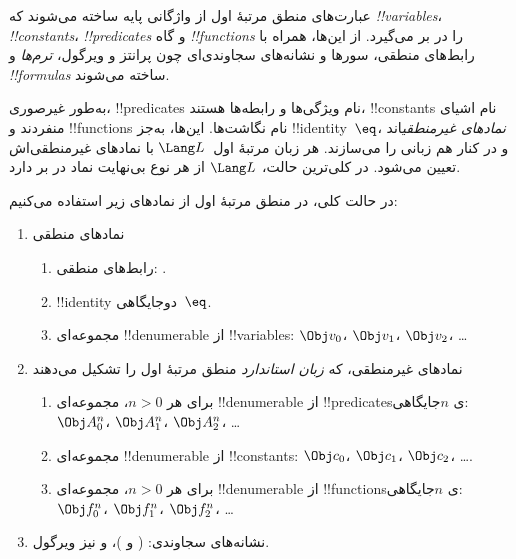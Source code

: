 \documentclass[../../../include/open-logic-section]{subfiles}
\begin{document}



عبارت‌های منطق مرتبهٔ اول از واژگانی پایه ساخته می‌شوند که
\emph{!!{variable}s}، \emph{!!{constant}s}،
\emph{!!{predicate}s} و گاه \emph{!!{function}s} را در بر می‌گیرد.
از این‌ها، همراه با رابط‌های منطقی، سورها و نشانه‌های سجاوندی‌ای چون
پرانتز و ویرگول، \emph{ترم‌ها} و \emph{!!{formula}s} ساخته می‌شوند.

\begin{explain}
به‌طور غیرصوری، !!{predicate}s نام ویژگی‌ها و رابطه‌ها هستند،
!!{constant}s نام اشیای منفردند و !!{function}s نام نگاشت‌ها. این‌ها، به‌جز
!!{identity}~$\eq$، \emph{نمادهای غیرمنطقی}اند و در کنار هم زبانی را
می‌سازند. هر زبان مرتبهٔ اول~$\Lang L$ با نمادهای غیرمنطقی‌اش تعیین می‌شود.
در کلی‌ترین حالت، $\Lang L$ از هر نوع بی‌نهایت نماد در بر دارد.
\end{explain}

در حالت کلی، در منطق مرتبهٔ اول از نمادهای زیر استفاده می‌کنیم:

\begin{enumerate}
\item نمادهای منطقی
\begin{enumerate}
\item رابط‌های منطقی:
  \startycommalist
  .
\item !!{identity} دوجایگاهی~$\eq$.
\item مجموعه‌ای !!{denumerable} از !!{variable}s: $\Obj v_0$، $\Obj v_1$، $\Obj
  v_2$، \dots
\end{enumerate}
\item نمادهای غیرمنطقی، که \emph{زبان استاندارد} منطق مرتبهٔ اول را
تشکیل می‌دهند
\begin{enumerate}
\item برای هر $n>0$، مجموعه‌ای !!{denumerable} از !!{predicate}sی
  $n$جایگاهی: $\Obj A^n_0$، $\Obj A^n_1$، $\Obj A^n_2$، \dots
\item مجموعه‌ای !!{denumerable} از !!{constant}s: $\Obj c_0$، $\Obj c_1$، $\Obj
  c_2$، \dots.
\item برای هر $n>0$، مجموعه‌ای !!{denumerable} از !!{function}sی
  $n$جایگاهی: $\Obj f^n_0$، $\Obj f^n_1$، $\Obj f^n_2$، \dots
\end{enumerate}
\item نشانه‌های سجاوندی: ( و )، و نیز ویرگول.
\end{enumerate}
\end{document}
